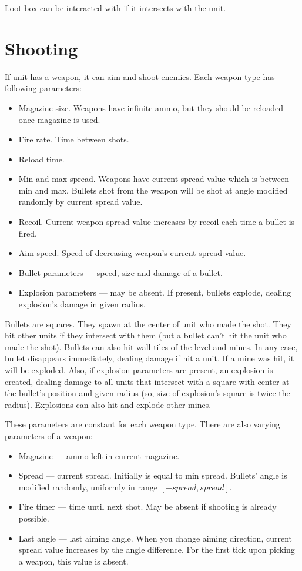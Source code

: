 Loot box can be interacted with if it intersects with the unit.

\section{Shooting}

If unit has a weapon, it can aim and shoot enemies. Each weapon type has following parameters:
\begin{itemize}
      \item Magazine size. Weapons have infinite ammo, but they should be reloaded once magazine is used.
      \item Fire rate. Time between shots.
      \item Reload time.
      \item Min and max spread. Weapons have current spread value which is between min and max.
            Bullets shot from the weapon will be shot at angle modified randomly by current spread value.
      \item Recoil. Current weapon spread value increases by recoil each time a bullet is fired.
      \item Aim speed. Speed of decreasing weapon's current spread value.
      \item Bullet parameters --- speed, size and damage of a bullet.
      \item Explosion parameters --- may be absent.
            If present, bullets explode, dealing explosion's damage in given radius.
\end{itemize}

Bullets are squares. They spawn at the center of unit who made the shot.
They hit other units if they intersect with them (but a bullet can't hit the unit who made the shot).
Bullets can also hit wall tiles of the level and mines.
In any case, bullet disappears immediately, dealing damage if hit a unit.
If a mine was hit, it will be exploded.
Also, if explosion parameters are present, an explosion is created,
dealing damage to all units that intersect with a square with center at the bullet's position and given radius
(so, size of explosion's square is twice the radius). Explosions can also hit and explode other mines.

These parameters are constant for each weapon type. There are also varying parameters of a weapon:
\begin{itemize}
      \item Magazine --- ammo left in current magazine.
      \item Spread --- current spread. Initially is equal to min spread.
            Bullets' angle is modified randomly, uniformly in range $[-spread, spread]$.
      \item Fire timer --- time until next shot. May be absent if shooting is already possible.
      \item Last angle --- last aiming angle. When you change aiming direction,
            current spread value increases by the angle difference.
            For the first tick upon picking a weapon, this value is absent.
\end{itemize}

